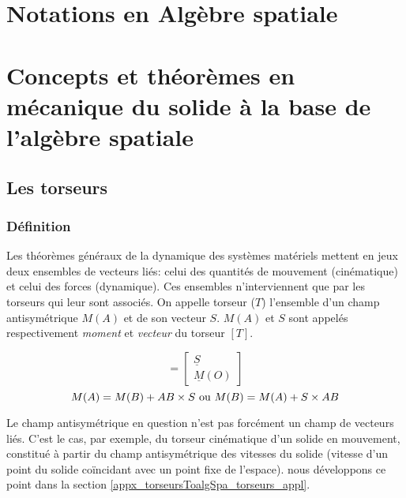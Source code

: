 
\chapter{Notations en Algèbre spatiale} \label{appx_notations}

\chapter{Concepts et théorèmes en mécanique du solide à la base de l'algèbre spatiale} \label{appx_torseursToalgSpa}

\section{Les torseurs} \label{appx_torseursToalgSpa_torseurs}

\subsection{Définition} \label{appx_torseursToalgSpa_torseurs_def}
Les théorèmes généraux de la dynamique des systèmes matériels mettent en jeux deux ensembles de vecteurs liés: celui des quantités de mouvement (cinématique) et celui des forces (dynamique). Ces ensembles n'interviennent que par les torseurs qui leur sont associés. On appelle torseur ($T$) l'ensemble d'un champ antisymétrique $M(A)$ et de son vecteur $S$. $M(A)$ et $S$ sont appelés respectivement \emph{moment} et \emph{vecteur} du torseur $[T]$.

\vspace{0.3cm} %

{%
\begin{equation*}
[\underline{T}]=
\begin{bmatrix}
  \underline{S} \\
  \underline{M}(O)
\end{bmatrix}
\end{equation*}
}
{%
\begin{equation}
M(A)=M(B)+AB \times S \textnormal{ ou } M(B)=M(A)+S \times AB
\end{equation}
}
{}

\vspace{0.3cm} %

Le champ antisymétrique en question n'est pas forcément un champ de vecteurs liés. C'est le cas, par exemple, du torseur cinématique d'un solide en mouvement, constitué à partir du champ antisymétrique des vitesses du solide (vitesse d'un point du solide coïncidant avec un point fixe de l'espace). nous développons ce point dans la section \ref{appx_torseursToalgSpa_torseurs_appl}.

